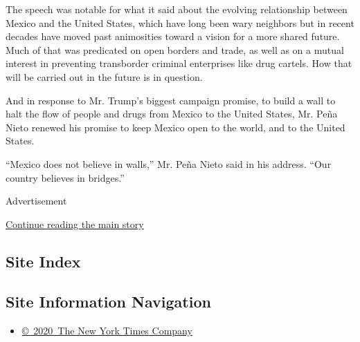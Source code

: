 The speech was notable for what it said about the evolving relationship
between Mexico and the United States, which have long been wary
neighbors but in recent decades have moved past animosities toward a
vision for a more shared future. Much of that was predicated on open
borders and trade, as well as on a mutual interest in preventing
transborder criminal enterprises like drug cartels. How that will be
carried out in the future is in question.

And in response to Mr. Trump's biggest campaign promise, to build a wall
to halt the flow of people and drugs from Mexico to the United States,
Mr. Peña Nieto renewed his promise to keep Mexico open to the world, and
to the United States.

``Mexico does not believe in walls,'' Mr. Peña Nieto said in his
address. ``Our country believes in bridges.''

Advertisement

\protect\hyperlink{after-bottom}{Continue reading the main story}

\hypertarget{site-index}{%
\subsection{Site Index}\label{site-index}}

\hypertarget{site-information-navigation}{%
\subsection{Site Information
Navigation}\label{site-information-navigation}}

\begin{itemize}
\tightlist
\item
  \href{https://help.nytimes.com/hc/en-us/articles/115014792127-Copyright-notice}{©~2020~The
  New York Times Company}
\end{itemize}

